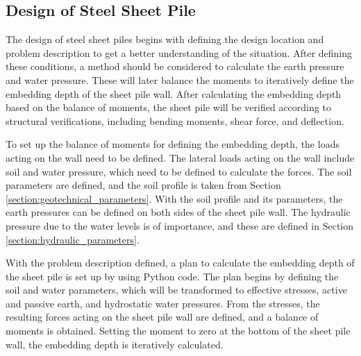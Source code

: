 



\newpage

\subsection{Design of Steel Sheet Pile}

The design of steel sheet piles begins with defining the design location and problem description to get a better understanding of the situation. After defining these conditions, a method should be considered to calculate the earth pressure and water pressure. These will later balance the moments to iteratively define the embedding depth of the sheet pile wall. After calculating the embedding depth based on the balance of moments, the sheet pile will be verified according to structural verifications, including bending moments, shear force, and deflection.  

To set up the balance of moments for defining the embedding depth, the loads acting on the wall need to be defined. The lateral loads acting on the wall include soil and water pressure, which need to be defined to calculate the forces. The soil parameters are defined, and the soil profile is taken from Section \ref{section:geotechnical_parameters}. With the soil profile and its parameters, the earth pressures can be defined on both sides of the sheet pile wall. The hydraulic pressure due to the water levels is of importance, and these are defined in Section \ref{section:hydraulic_parameters}. 

With the problem description defined, a plan to calculate the embedding depth of the sheet pile is set up by using Python code. The plan begins by defining the soil and water parameters, which will be transformed to effective stresses, active and passive earth, and hydrostatic water pressures. From the stresses, the resulting forces acting on the sheet pile wall are defined, and a balance of moments is obtained. Setting the moment to zero at the bottom of the sheet pile wall, the embedding depth is iteratively calculated.

